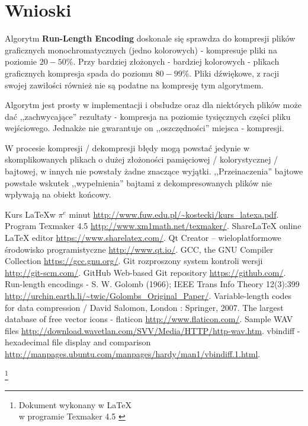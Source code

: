 \documentclass[12pt,a4paper,notitlepage]{report}
\newcommand\blfootnote[1]{%
  \begingroup
  \renewcommand\thefootnote{}\footnote{#1}%
  \addtocounter{footnote}{-1}%
  \endgroup
}
\begin{document}
\section{Wnioski}
Algorytm \textbf{Run-Length Encoding} doskonale się sprawdza do kompresji plików graficznych monochromatycznych (jedno kolorowych) - kompresuje pliki na poziomie $20-50 \%$. Przy bardziej złożonych - bardziej kolorowych - plikach graficznych kompresja spada do poziomu $80-99\%$. Pliki dźwiękowe, z racji swojej zawiłości również nie są podatne na kompresję tym algorytmem.

Algorytm jest prosty w implementacji i obsłudze oraz dla niektórych plików może dać ,,zachwycające'' rezultaty - kompresja na poziomie tysięcznych części pliku wejściowego. Jednakże nie gwarantuje on ,,oszczędności'' miejsca - kompresji.

W procesie kompresji / dekompresji błędy mogą powstać jedynie w skomplikowanych plikach o dużej złożoności pamięciowej / kolorystycznej / bajtowej, w innych nie powstały żadne znaczące wyjątki. ,,Przeinaczenia'' bajtowe powstałe wskutek ,,wypełnienia'' bajtami z dekompresowanych plików nie wpływają na obiekt końcowy.

\begin{thebibliography}{1}
	 Kurs \LaTeX w $\pi^e$ minut \url{http://www.fuw.edu.pl/~kostecki/kurs_latexa.pdf}.
	 Program Texmaker 4.5 \url{http://www.xm1math.net/texmaker/}.
	 ShareLaTeX online LaTeX editor \url{https://www.sharelatex.com/}.	
	 Qt Creator – wieloplatformowe środowisko programistyczne \url{http://www.qt.io/}.
	 GCC, the GNU Compiler Collection \url{https://gcc.gnu.org/}.
	 Git rozproszony system kontroli wersji \url{http://git-scm.com/}.
	 GitHub Web-based Git repository \url{https://github.com/}.
	 Run-length encodings - S. W. Golomb (1966); IEEE Trans Info Theory 12(3):399 \url{http://urchin.earth.li/~twic/Golombs_Original_Paper/}.
	 Variable-length codes for data compression / David Salomon, London : Springer, 2007.
	 The largest database of free vector icons - flaticon \url{http://www.flaticon.com/}.
	 Sample WAV files \url{http://download.wavetlan.com/SVV/Media/HTTP/http-wav.htm}.
	 vbindiff - hexadecimal file display and comparison \url{http://manpages.ubuntu.com/manpages/hardy/man1/vbindiff.1.html}.
\end{thebibliography}

	\blfootnote{Dokument wykonany w \LaTeX \cite{latex} \\ w programie Texmaker 4.5 \cite{program}}	
\end{document}
